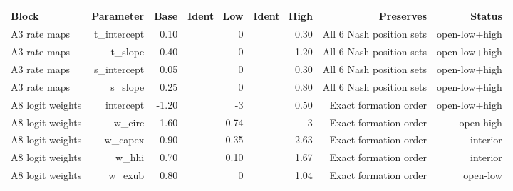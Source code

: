 

\begin{tabular}{@{}lrrrrrr@{}}
\toprule
Block & Parameter & Base & Ident\_Low & Ident\_High & Preserves & Status \\
\midrule
A3 rate maps & t\_intercept & 0.10 & 0 & 0.30 & All 6 Nash position sets & open-low+high \\
A3 rate maps & t\_slope & 0.40 & 0 & 1.20 & All 6 Nash position sets & open-low+high \\
A3 rate maps & s\_intercept & 0.05 & 0 & 0.30 & All 6 Nash position sets & open-low+high \\
A3 rate maps & s\_slope & 0.25 & 0 & 0.80 & All 6 Nash position sets & open-low+high \\
A8 logit weights & intercept & -1.20 & -3 & 0.50 & Exact formation order & open-low+high \\
A8 logit weights & w\_circ & 1.60 & 0.74 & 3 & Exact formation order & open-high \\
A8 logit weights & w\_capex & 0.90 & 0.35 & 2.63 & Exact formation order & interior \\
A8 logit weights & w\_hhi & 0.70 & 0.10 & 1.67 & Exact formation order & interior \\
A8 logit weights & w\_exub & 0.80 & 0 & 1.04 & Exact formation order & open-low \\
\bottomrule
\end{tabular}